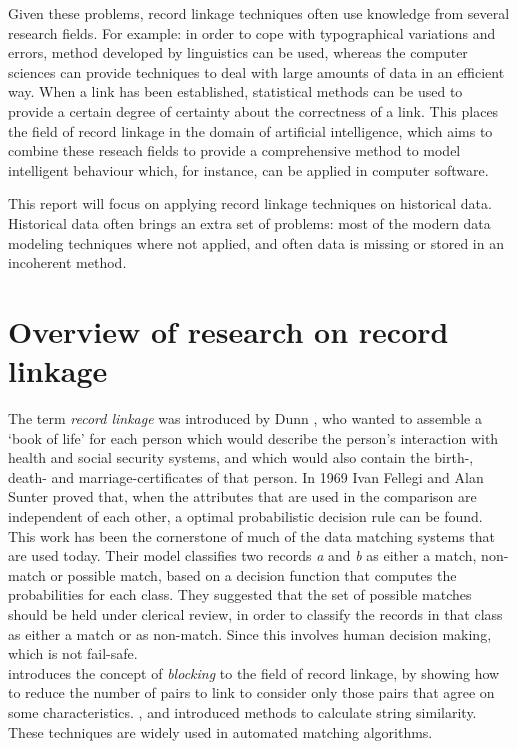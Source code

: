 Given these problems, record linkage techniques often use knowledge from several research fields. For example: in order to cope with typographical variations and errors, method developed by linguistics can be used, whereas the computer sciences can provide techniques to deal with large amounts of data in an efficient way. When a link has been established, statistical methods can be used to provide a certain degree of certainty about the correctness of a link. This places the field of record linkage in the domain of artificial intelligence, which aims to combine these reseach fields to provide a comprehensive method to model intelligent behaviour which, for instance, can be applied in computer software.

This report will focus on applying record linkage techniques on historical data. Historical data often brings an extra set of problems: most of the modern data modeling techniques where not applied, and often data is missing or stored in an incoherent method. 

\section{Overview of research on record linkage}
The term \textit{record linkage} was introduced by Dunn \cite{dunn1946record}, who wanted to assemble a `book of life' for each person which would describe the person's interaction with health and social security systems, and which would also contain the birth-, death- and marriage-certificates of that person. In 1969 Ivan Fellegi and Alan Sunter \cite{fellegi1969theory} proved that, when the attributes that are used in the comparison are independent of each other, a optimal probabilistic decision rule can be found. This work has been the cornerstone of much of the data matching systems that are used today. Their model classifies two records \textit{a} and \textit{b} as either a match, non-match or possible match, based on a decision function that computes the probabilities for each class. They suggested that the set of possible matches should be held under clerical review, in order to classify the records in that class as either a match or as non-match. Since this involves human decision making, which is not fail-safe.\\ 

\cite{newcombe1962record} introduces the concept of \textit{blocking} to the field of record linkage, by showing how to reduce the number of pairs to link to consider only those pairs that agree on some characteristics. \cite{levenshtein1966binary}, \cite{jaro1989advances} and \cite{winkler1990string} introduced methods to calculate string similarity. These techniques are widely used in automated matching algorithms.\\


